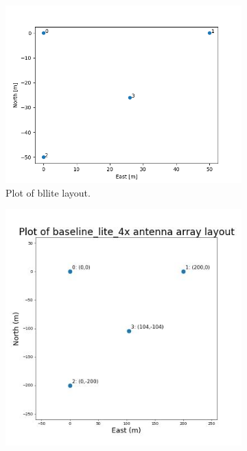 \documentclass{article}
\begin{document}
\begin{figure}[t!] %
\begin{subfigure}{0.35\textwidth}
\includegraphics[width=\linewidth]{documentation_figures/bllite_layout.png}
\caption{Plot of bllite layout.} \label{fig:bllite}
\end{subfigure}\hspace*{\fill}
\begin{subfigure}{0.30\textwidth}
\includegraphics[width=\linewidth]{documentation_figures/rendered_baseline_lite_4x.jpg}

\end{subfigure}
\end{figure}
\end{document}
